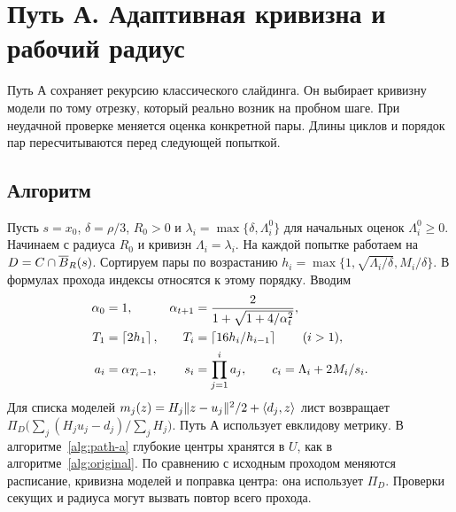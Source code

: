\section{Путь А. Адаптивная кривизна и рабочий радиус}\label{sec:patha}

Путь А сохраняет рекурсию классического слайдинга. Он выбирает
кривизну модели по тому отрезку, который реально возник на пробном
шаге. При неудачной проверке меняется оценка конкретной пары.
Длины циклов и порядок пар пересчитываются перед следующей попыткой.

\subsection{Алгоритм}

Пусть $s=x_0$, $\delta=\rho/3$, $R_0>0$ и
$\lambda_i=\max\{\delta,\Lambda_i^0\}$ для начальных оценок
$\Lambda_i^0\ge0$. Начинаем с радиуса $R_0$ и кривизн
$\Lambda_i=\lambda_i$. На каждой попытке работаем на
$D=C\cap\overline B_R(s)$. Сортируем пары по возрастанию
$h_i=\max\{1,\sqrt{\Lambda_i/\delta},M_i/\delta\}$. В формулах прохода
индексы относятся к этому порядку. Вводим
\begin{align}
 \alpha_0&=1,& \alpha_{t+1}&=\frac{2}{1+\sqrt{1+4/\alpha_t^2}},\\*
 T_1&=\left\lceil 2h_1\right\rceil,&
 T_i&=\left\lceil 16h_i/h_{i-1}\right\rceil\qquad(i>1),\\*
 a_i&=\alpha_{T_i-1},&
 s_i&=\prod_{j=1}^{i}a_j,\qquad c_i=\Lambda_i+2M_i/s_i.
 \label{eq:pa-parameters}
\end{align}
Для списка моделей $m_j(z)=H_j\lVert z-u_j\rVert^2/2+\langle d_j,z\rangle$
лист возвращает $\Pi_D\bigl(\sum_j(H_j u_j-d_j)/\sum_j H_j\bigr)$.
Путь А использует евклидову метрику. В алгоритме~\ref{alg:path-a}
глубокие центры хранятся в $U$, как в алгоритме~\ref{alg:original}.
По сравнению с исходным проходом меняются расписание, кривизна
моделей и поправка центра: она использует $\Pi_D$. Проверки секущих
и радиуса могут вызвать повтор всего прохода.

